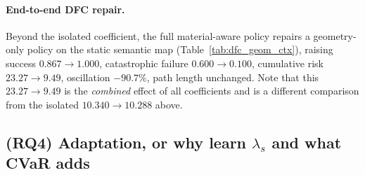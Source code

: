 \paragraph{End-to-end DFC repair.}
Beyond the isolated coefficient, the full material-aware policy repairs a geometry-only policy on the static semantic map (Table~\ref{tab:dfc_geom_ctx}), raising success $0.867\!\to\!1.000$, catastrophic failure $0.600\!\to\!0.100$, cumulative risk $23.27\!\to\!9.49$, oscillation $-90.7\%$, path length unchanged. Note that this $23.27\!\to\!9.49$ is the \emph{combined} effect of all coefficients and is a different comparison from the isolated $10.340\!\to\!10.288$ above.

\begin{table}[t]
\centering
\caption{\textbf{DFC2018 combined repair} ($300$ paired episodes; dense
semantic map). A geometry-only policy versus the full material-aware policy on
identical episodes, with \emph{all} coefficients active. ``Catastrophic
failure'' is an episode with at least one hard-hazard contact; oscillation is
total absolute heading change along the path, $\sum_t|\Delta\theta_t|$. This is the combined
effect of every channel and is therefore a different comparison from the
one-factor $\lambda_s$ intervention in Table~\ref{tab:one_factor}, where only
the soft coefficient changes and the effect is correspondingly much smaller.}
\label{tab:dfc_geom_ctx}
\scriptsize\setlength{\tabcolsep}{3pt}\renewcommand{\arraystretch}{1.08}
\end{table}

\subsection{(RQ4) Adaptation, or why learn $\lambda_s$ and what CVaR adds}
\label{sec:exp_adapt}

